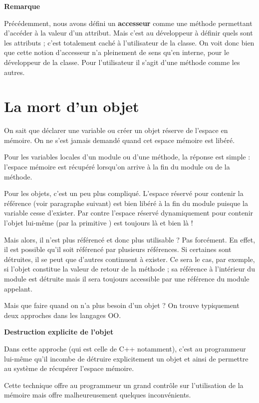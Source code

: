 {\bfseries
Remarque}

Précédemment, nous avons défini un \textbf{accesseur} comme une méthode
permettant d’accéder à la valeur d’un attribut. Mais c’est au
développeur à définir quels sont les attributs ; c’est totalement caché
à l’utilisateur de la classe. On voit donc bien que cette notion
d’accesseur n’a pleinement de sens qu’en interne, pour le développeur
de la classe. Pour l’utilisateur il s’agit d’une méthode comme les
autres.


\section{La mort d'un objet}

On sait que déclarer une variable ou créer un objet réserve de l’espace
en mémoire. On ne s’est jamais demandé quand cet espace mémoire est
libéré.

Pour les variables locales d’un module ou d'une
méthode, la réponse est simple : l’espace mémoire est récupéré
lorsqu’on arrive à la fin du module ou de la méthode.

Pour les objets, c’est un peu plus compliqué. L’espace réservé pour
contenir la référence (voir paragraphe suivant) est bien libéré à la
fin du module puisque la variable cesse d’exister. Par contre l’espace
réservé dynamiquement pour contenir l’objet lui-même (par la primitive
) est toujours là et bien là !

Mais alors, il n’est plus référencé et donc plus utilisable ? Pas
forcément. En effet, il est possible qu’il soit référencé par plusieurs
références. Si certaines sont détruites, il se peut que d’autres
continuent à exister. Ce sera le cas, par exemple, si l’objet constitue
la valeur de retour de la méthode ; sa référence à l’intérieur du
module est détruite mais il sera toujours accessible par une référence
du module appelant.

Mais que faire quand on n’a plus besoin d’un objet ? On trouve
typiquement deux approches dans les langages OO.

{\sffamily\bfseries\upshape
Destruction explicite de l’objet}

Dans cette approche (qui est celle de C++ notamment), c’est au
programmeur lui-même qu’il incombe de détruire explicitement un objet
et ainsi de permettre au système de récupérer l’espace mémoire. 

Cette technique offre au programmeur un grand contrôle sur l’utilisation
de la mémoire mais offre malheureusement quelques inconvénients.


